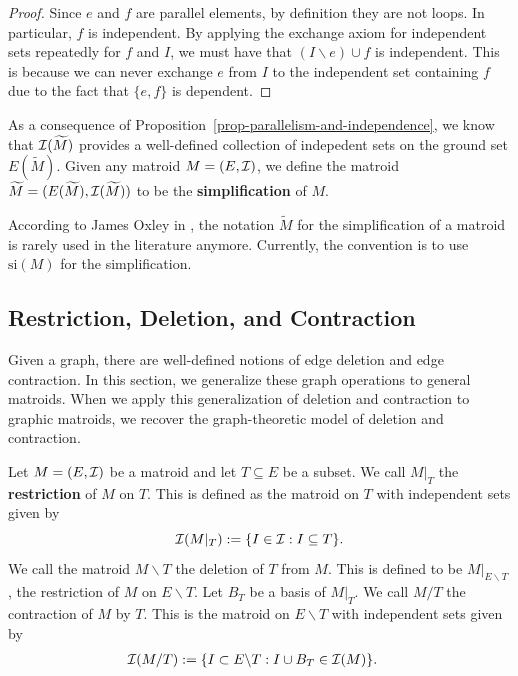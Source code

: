 \documentclass{puthesis-UG}
\begin{document}
\begin{proof}
	Since $e$ and $f$ are parallel elements, by definition they are not loops. In particular, $f$ is independent. By applying the exchange axiom for independent sets repeatedly for $f$ and $I$, we must have that $(I \backslash e) \cup f$ is independent. This is because we can never exchange $e$ from $I$ to the independent set containing $f$ due to the fact that $\{e, f\}$ is dependent. 
\end{proof}

As a consequence of Proposition~\ref{prop-parallelism-and-independence}, we know that $\mathcal{I}(\widetilde{M})$ provides a well-defined collection of indepedent sets on the ground set $E(\widetilde{M})$. Given any matroid $M = (E, \mathcal{I})$, we define the matroid $\widetilde{M} = (E(\widetilde{M}), \mathcal{I}(\widetilde{M}))$ to be the \textbf{simplification} of $M$.

\begin{remark}
	According to James Oxley in \cite{10.5555/1197093}, the notation $\widetilde{M}$ for the simplification of a matroid is rarely used in the literature anymore. Currently, the convention is to use $\text{si}(M)$ for the simplification.  
\end{remark} 

\subsection{Restriction, Deletion, and Contraction} \label{sec:contraction-deletion}

Given a graph, there are well-defined notions of edge deletion and edge contraction. In this section, we generalize these graph operations to general matroids. When we apply this generalization of deletion and contraction to graphic matroids, we recover the graph-theoretic model of deletion and contraction. 

\begin{defn} \label{contraction-deletion}
	Let $M = (E, \mathcal{I})$ be a matroid and let $T \subseteq E$ be a subset. We call $M|_T$ the \textbf{restriction} of $M$ on $T$. This is defined as the matroid on $T$ with independent sets given by 
	\[
		\mathcal{I} (M|_T) := \{I \in \mathcal{I} : I \subseteq T\}.
	\]
	We call the matroid $M \backslash T$ the deletion of $T$ from $M$. This is defined to be $M|_{E \backslash T}$, the restriction of $M$ on $E \backslash T$. Let $B_T$ be a basis of $M|_T$. We call $M / T$ the contraction of $M$ by $T$. This is the matroid on $E \backslash T$ with independent sets given by
	\begin{align*}
		\mathcal{I}(M/T) & := \{I \subset E \backslash T: I \cup B_T \in \mathcal{I}(M) \}.
	\end{align*}
\end{defn}
\end{document}
